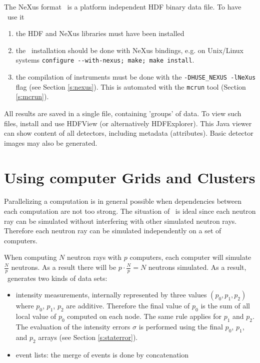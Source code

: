 The NeXus format~\cite{nexus_webpage} is a platform independent HDF binary data
file. To have \MCS\ use it
\begin{enumerate}
\item the HDF and NeXus libraries must have been installed
\item the \MCS\ installation should be done with NeXus bindings, e.g. on
  Unix/Linux systems \verb+configure --with-nexus; make; make install+.
\item the compilation of instruments must be done with the
  \verb+-DHUSE_NEXUS -lNeXus+ flag (see Section \ref{s:nexus}). This is
  automated with the \verb+mcrun+ tool (Section \ref{s:mcrun}).
\end{enumerate}
All results are saved in a single file, containing 'groups' of data. To view
such files, install and use HDFView (or alternatively HDFExplorer). This Java
viewer can show content of all detectors, including metadata (attributes). Basic
detector images may also be generated.

\section{Using computer Grids and Clusters}
\label{s:run-mpi}

Parallelizing a computation is in general possible when dependencies between
  each computation are not too strong. The situation of \MCS\ is
  ideal since each neutron ray can be simulated without interfering with
  other simulated neutron rays. Therefore each neutron ray can be simulated
  independently on a set of computers.

  When computing $N$ neutron rays with $p$ computers, each computer will
  simulate $\frac{N}{p}$ neutrons. As a result there will be $p \cdot
  \frac{N}{p} = N$ neutrons simulated. As a result, \MCS\ generates two kinds of
  data sets:
\begin{itemize}
\item intensity measurements, internally represented by three
  values $(p_0, p_1, p_2)$ where $p_0$, $p_1$, $p_2$ are
  additive. Therefore the final value of $p_0$ is the sum of all
  local value of  $p_0$ computed on each node. The same rule applies
  for $p_1$ and $p_2$. The evaluation of the intensity errors $\sigma$
  is performed using the final $p_0$, $p_1$, and $p_2$ arrays (see Section \ref{s:staterror}).
\item event lists: the merge of events is done by concatenation
\end{itemize}


